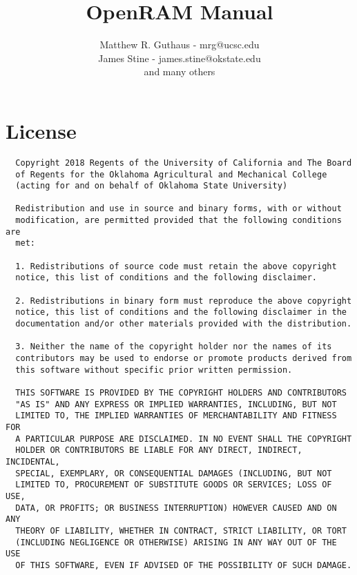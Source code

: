 \documentclass[11pt]{article}
\begin{document}
\title{OpenRAM Manual}
\author{Matthew R. Guthaus - mrg@ucsc.edu\\
  James Stine - james.stine@okstate.edu\\
  and many others
}
\maketitle
\newpage
\section{License}

\begin{verbatim}
  Copyright 2018 Regents of the University of California and The Board
  of Regents for the Oklahoma Agricultural and Mechanical College
  (acting for and on behalf of Oklahoma State University)
  
  Redistribution and use in source and binary forms, with or without
  modification, are permitted provided that the following conditions are
  met:
  
  1. Redistributions of source code must retain the above copyright
  notice, this list of conditions and the following disclaimer.
  
  2. Redistributions in binary form must reproduce the above copyright
  notice, this list of conditions and the following disclaimer in the
  documentation and/or other materials provided with the distribution.
  
  3. Neither the name of the copyright holder nor the names of its
  contributors may be used to endorse or promote products derived from
  this software without specific prior written permission.
  
  THIS SOFTWARE IS PROVIDED BY THE COPYRIGHT HOLDERS AND CONTRIBUTORS
  "AS IS" AND ANY EXPRESS OR IMPLIED WARRANTIES, INCLUDING, BUT NOT
  LIMITED TO, THE IMPLIED WARRANTIES OF MERCHANTABILITY AND FITNESS FOR
  A PARTICULAR PURPOSE ARE DISCLAIMED. IN NO EVENT SHALL THE COPYRIGHT
  HOLDER OR CONTRIBUTORS BE LIABLE FOR ANY DIRECT, INDIRECT, INCIDENTAL,
  SPECIAL, EXEMPLARY, OR CONSEQUENTIAL DAMAGES (INCLUDING, BUT NOT
  LIMITED TO, PROCUREMENT OF SUBSTITUTE GOODS OR SERVICES; LOSS OF USE,
  DATA, OR PROFITS; OR BUSINESS INTERRUPTION) HOWEVER CAUSED AND ON ANY
  THEORY OF LIABILITY, WHETHER IN CONTRACT, STRICT LIABILITY, OR TORT
  (INCLUDING NEGLIGENCE OR OTHERWISE) ARISING IN ANY WAY OUT OF THE USE
  OF THIS SOFTWARE, EVEN IF ADVISED OF THE POSSIBILITY OF SUCH DAMAGE.
\end{verbatim}
\end{document}
